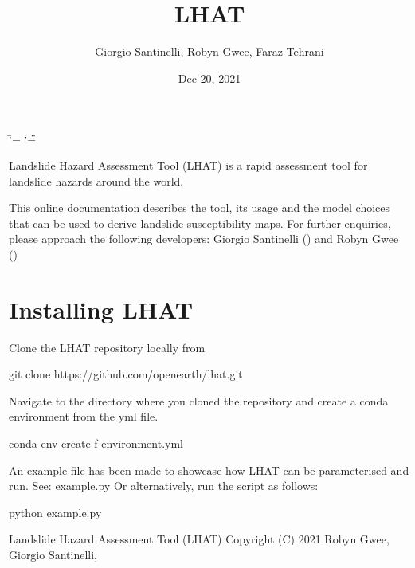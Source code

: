 \documentclass[letterpaper,10pt,english]{sphinxmanual}
\title{LHAT}
\date{Dec 20, 2021}
\author{Giorgio Santinelli, Robyn Gwee, Faraz Tehrani}
\begin{document}
\ifdefined\shorthandoff
  \ifnum\catcode`\=\string=\active\shorthandoff{=}\fi
  \ifnum\catcode`\"=\active{}\fi
\fi

\pagestyle{empty}
\sphinxmaketitle
\pagestyle{plain}
\sphinxtableofcontents
\pagestyle{normal}
\label{\detokenize{index::doc}}


Landslide Hazard Assessment Tool (LHAT) is a rapid assessment tool for landslide hazards around the world.

This online documentation describes the tool, its usage and the model choices that can be used to derive landslide susceptibility maps.
For further enquiries, please approach the following developers: Giorgio Santinelli () and Robyn Gwee ()


\chapter{Installing LHAT}
\label{\detokenize{index:installing-lhat}}
Clone the LHAT repository locally from 

\begin{sphinxVerbatim}[commandchars=\\\{\}]
\PYGZgt{}\PYGZgt{} git clone https://github.com/openearth/lhat.git
\end{sphinxVerbatim}

Navigate to the directory where you cloned the repository and create a conda environment from the yml file.

\begin{sphinxVerbatim}[commandchars=\\\{\}]
\PYGZgt{}\PYGZgt{} conda env create \PYGZhy{}f environment.yml
\end{sphinxVerbatim}

An example file has been made to showcase how LHAT can be parameterised and run. See: example.py
Or alternatively, run the script as follows:

\begin{sphinxVerbatim}[commandchars=\\\{\}]
\PYGZgt{}\PYGZgt{} python example.py
\end{sphinxVerbatim}
\label{\detokenize{index:module-lhat}}
Landslide Hazard Assessment Tool (LHAT)
Copyright (C) 2021 Robyn Gwee, Giorgio Santinelli,
\end{document}
